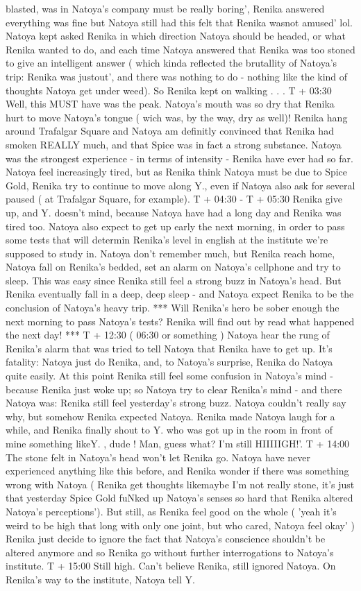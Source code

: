 \documentclass[12pt]{book}
\begin{document}
blasted, was in Natoya's company must be really boring', Renika answered everything was fine but Natoya still had this felt that Renika wasnot amused' lol. Natoya kept asked Renika in which direction Natoya should be headed, or what Renika wanted to do, and each time Natoya answered that Renika was too stoned to give an intelligent answer ( which kinda reflected the brutallity of Natoya's trip: Renika was justout', and there was nothing to do - nothing like the kind of thoughts Natoya get under weed). So Renika kept on walking . . .  T + 03:30 Well, this MUST have was the peak. Natoya's mouth was so dry that Renika hurt to move Natoya's tongue ( wich was, by the way, dry as well)! Renika hang around Trafalgar Square and Natoya am definitly convinced that Renika had smoken REALLY much, and that Spice was in fact a strong substance. Natoya was the strongest experience - in terms of intensity - Renika have ever had so far. Natoya feel increasingly tired, but as Renika think Natoya must be due to Spice Gold, Renika try to continue to move along Y., even if Natoya also ask for several paused ( at Trafalgar Square, for example). T + 04:30 - T + 05:30 Renika give up, and Y. doesn't mind, because Natoya have had a long day and Renika was tired too. Natoya also expect to get up early the next morning, in order to pass some tests that will determin Renika's level in english at the institute we're supposed to study in. Natoya don't remember much, but Renika reach home, Natoya fall on Renika's bedded, set an alarm on Natoya's cellphone and try to sleep. This was easy since Renika still feel a strong buzz in Natoya's head. But Renika eventually fall in a deep, deep sleep - and Natoya expect Renika to be the conclusion of Natoya's heavy trip. *** Will Renika's hero be sober enough the next morning to pass Natoya's tests? Renika will find out by read what happened the next day! *** T + 12:30 ( 06:30 or something ) Natoya hear the rung of Renika's alarm that was tried to tell Natoya that Renika have to get up. It's fatality: Natoya just do Renika, and, to Natoya's surprise, Renika do Natoya quite easily. At this point Renika still feel some confusion in Natoya's mind - because Renika just woke up; so Natoya try to clear Renika's mind - and there Natoya was: Renika still feel yesterday's strong buzz. Natoya couldn't really say why, but somehow Renika expected Natoya. Renika made Natoya laugh for a while, and Renika finally shout to Y. who was got up in the room in front of mine something likeY. , dude ! Man, guess what? I'm still HIIIIIGH!'. T + 14:00 The stone felt in Natoya's head won't let Renika go. Natoya have never experienced anything like this before, and Renika wonder if there was something wrong with Natoya ( Renika get thoughts likemaybe I'm not really stone, it's just that yesterday Spice Gold fuNked up Natoya's senses so hard that Renika altered Natoya's perceptions'). But still, as Renika feel good on the whole ( 'yeah it's weird to be high that long with only one joint, but who cared, Natoya feel okay' ) Renika just decide to ignore the fact that Natoya's conscience shouldn't be altered anymore and so Renika go without further interrogations to Natoya's institute. T + 15:00 Still high. Can't believe Renika, still ignored Natoya. On Renika's way to the institute, Natoya tell Y. 
\end{document}
